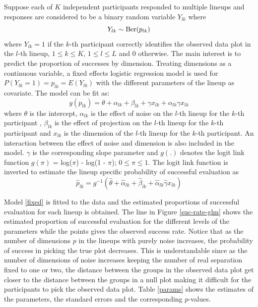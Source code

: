 \documentclass[12]{article}
\begin{document}
Suppose each of $K$ independent participants responded to multiple lineups and responses are considered to be a binary random variable $Y_{lk}$ where $$Y_{lk} \sim \hbox{Ber}(p_{lk})$$ where $Y_{lk} = 1$ if the $k$-th participant correctly identifies the observed data plot in the $l$-th lineup, $1 \leq k \leq K$, $1 \leq l \leq L$ and 0 otherwise. The main interest is to predict the proportion of successes by dimension. Treating dimensions as a continuous variable, a fixed effects logistic regression model is used for $P(Y_{lk} = 1) = p_{lk} = E(Y_{lk})$ with the different parameters of the lineup as covariate.
The model can be fit as:
\begin{equation}
g(p_{lk}) = \theta + \alpha_{lk} + \beta_{lk} + \gamma x_{lk} + \alpha_{lk} \gamma x_{lk} \label{fixed}
\end{equation}
where $\theta$ is the intercept, $\alpha_{lk}$ is the effect of noise on the $l$-th lineup for the $k$-th participant ,
$\beta_{lk}$ is the effect of projection on the $l$-th lineup for the $k$-th participant 
and $x_{lk}$ is the dimension of the $l$-th lineup for the $k$-th participant. An interaction between the effect of noise and dimension is also included in the model. $\gamma$ is the corresponding slope parameter and $g(.)$ denotes the logit link function $g(\pi)$ = log($\pi$) - log(1 - $\pi$); $0 \leq \pi \leq 1$. The logit link function is inverted to estimate the lineup specific probability of successful evaluation as 
\begin{equation}
\hat{p}_{lk} = g^{-1}(\hat{\theta} + \hat{\alpha}_{lk} + \hat{\beta}_{lk} + \hat{\alpha}_{lk} \hat{\gamma} x_{lk}) \label{invert}
\end{equation}

Model \ref{fixed} is fitted to the data and the estimated proportions of successful evaluation for each lineup is obtained.  The line in Figure \ref{suc-rate-glm} shows the estimated proportion of successful evaluation for the different levels of the parameters while the points gives the observed success rate. Notice that as the number of dimensions $p$ in the lineups with purely noise increases, the probability of success in picking the true plot decreases. This is understandable since as the number of dimensions of noise increases keeping the number of real separation fixed to one or two, the distance between the groups in the observed data plot get closer to the distance between the groups in a null plot making it difficult for the participants to pick the observed data plot. Table \ref{params} shows the estimates of the parameters, the standard errors and the corresponding $p$-values.
\end{document}
